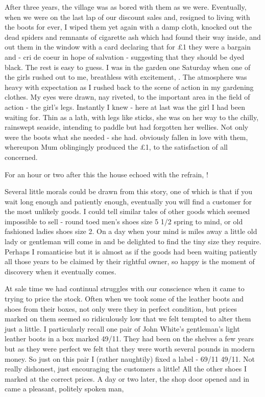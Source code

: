 After three years, the village was as bored with them as we were. Eventually, when we were on the last lap of our discount sales and, resigned to living with the boots for ever, I wiped them yet again with a damp cloth, knocked out the dead spiders and remnants of cigarette ash which had found their way inside, and out them in the window with a card declaring that for £1 they were a bargain and - cri de coeur in hope of salvation - suggesting that they should be dyed black. The rest is easy to guess. I was in the garden one Saturday when one of the girls rushed out to me, breathless with excitement, . The atmosphere was heavy with expectation as I rushed back to the scene of action in my gardening clothes. My eyes were drawn, nay riveted, to the important area in the field of action - the girl's legs. Instantly I knew - here at last was the girl I had been waiting for. Thin as a lath, with legs like sticks, she was on her way to the chilly, rainswept seaside, intending to paddle but had forgotten her wellies. Not only were the boots what she needed - she had. obviously fallen in love with them, whereupon Mum oblingingly produced the £1, to the satisfaction of all concerned.

For an hour or two after this the house echoed with the refrain, !

Several little morals could be drawn from this story, one of which is that if you wait long enough and patiently enough, eventually you will find a customer for the most unlikely goods. I could tell similar tales of other goods which seemed impossible to sell - round toed men's shoes size 5 1/2 spring to mind, or old fashioned ladies shoes size 2. On a day when your mind is miles away a little old lady or gentleman will come in and be delighted to find the tiny size they require. Perhaps I romanticise but it is almost as if the goods had been waiting patiently all those years to be claimed by their rightful owner, so happy is the moment of discovery when it eventually comes.

At sale time we had continual struggles with our conscience when it came to trying to price the stock. Often when we took some of the leather boots and shoes from their boxes, not only were they in perfect condition, but prices marked on them seemed so ridiculously low that we felt tempted to alter them just a little. I particularly recall one pair of John White’s gentleman’s light leather boots in a box marked 49/11. They had been on the shelves a few years but as they were perfect we felt that they were worth several pounds in modern money. So just on this pair I (rather naughtily) fixed a label - 69/11 49/11. Not really dishonest, just encouraging the customers a little! All the other shoes I marked at the correct prices. A day or two later, the shop door opened and in came a pleasant, politely spoken man,

